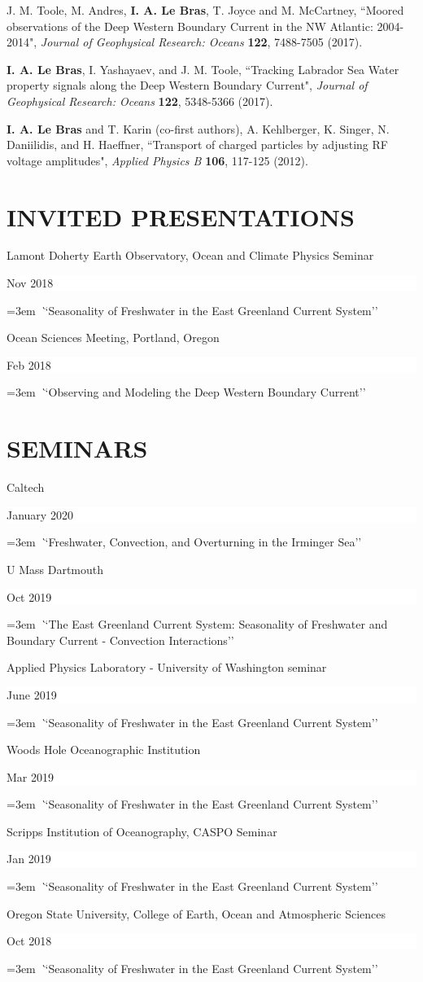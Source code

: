 \documentclass[paper=letter,fontsize=11pt]{scrartcl} %
\newcommand{\sepspace}{\vspace*{3mm}}		%
\newcommand{\NewPart}[2]{\section*{\uppercase{#1} #2}}
\newcommand{\PaperEntry}[6]{
		\noindent #1, ``#2", \textit{#3} \textbf{#4}, #5 (#6).}
\newcommand{\TalkEntry}[3]{
		\noindent #1 \hfill      %
		\colorbox{White}{%
			\parbox{6em}{%
			\hfill\color{Black}#2}} \par  %
		\noindent\hangindent=3em\hangafter=0 \textit ``#3''\sepspace} %
\begin{document}
\begin{etaremune}
\item \PaperEntry{J. M. Toole, M. Andres, \textbf{I. A. Le Bras}, T. Joyce and M. McCartney}{Moored observations of the Deep Western Boundary Current in the NW Atlantic: 2004-2014}{ Journal of Geophysical Research: Oceans}{122}{7488-7505}{2017}

\item \PaperEntry{\textbf{I. A. Le Bras}, I. Yashayaev, and J. M. Toole}{Tracking Labrador Sea Water property signals along the Deep Western Boundary Current}{ Journal of Geophysical Research: Oceans}{122}{5348-5366}{2017}

\item \PaperEntry{\textbf{I. A. Le Bras} and T. Karin (co-first authors), A. Kehlberger, K. Singer, N. Daniilidis, and H. Haeffner}{Transport of charged particles by adjusting RF voltage amplitudes}{Applied Physics B}{106}{117-125}{2012}

\end{etaremune}


\NewPart{Invited presentations}{}

\TalkEntry{Lamont Doherty Earth Observatory, Ocean and Climate Physics Seminar}{Nov 2018}{Seasonality of Freshwater in the East Greenland Current System}

\TalkEntry{Ocean Sciences Meeting, Portland, Oregon}{Feb 2018}{Observing and Modeling the Deep Western Boundary Current}

\NewPart{Seminars}{}
\TalkEntry{Caltech}{January 2020}{Freshwater, Convection, and Overturning in the Irminger Sea}

\TalkEntry{U Mass Dartmouth}{Oct 2019}{The East Greenland Current System: Seasonality of Freshwater and Boundary Current - Convection Interactions}

\TalkEntry{Applied Physics Laboratory - University of Washington seminar}{June 2019}{Seasonality of Freshwater in the East Greenland Current System}

\TalkEntry{Woods Hole Oceanographic Institution}{Mar 2019}{Seasonality of Freshwater in the East Greenland Current System}

\TalkEntry{Scripps Institution of Oceanography, CASPO Seminar}{Jan 2019}{Seasonality of Freshwater in the East Greenland Current System}

\TalkEntry{Oregon State University, College of Earth, Ocean and Atmospheric Sciences}{Oct 2018}{Seasonality of Freshwater in the East Greenland Current System}
\end{document}
